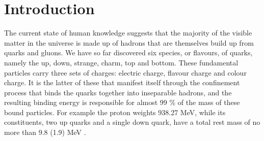 \chapter{Introduction}

The current state of human knowledge suggests that the majority of the visible
matter in the universe is made up of hadrons that are themselves build up from
quarks and gluons. We have so far discovered six species, or flavours, of quarks,
namely the up, down, strange, charm, top and bottom. These fundamental particles
carry three sets of charges: electric charge, flavour charge and colour charge.
It is the latter of these that manifest itself through the confinement process
that binds the quarks together into inseparable hadrons, and the resulting
binding energy is responsible for almost 99 \% of the mass of these bound
particles. For example the proton weights 938.27 MeV, while its constituents,
two up quarks and a single down quark, have a total rest mass of no more than
9.8 (1.9) MeV \citep{Agashe:2014kda}.


